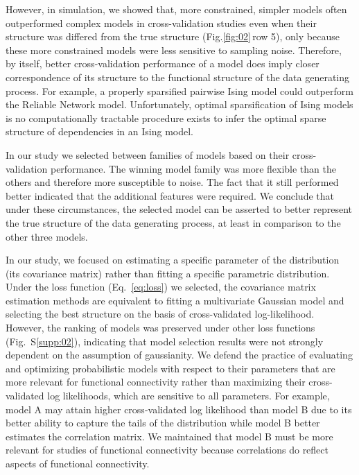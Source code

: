 \documentclass[10pt]{article}
\newcommand{\figref}[2]{Fig.\;\ref{fig:#1}\,#2}
\begin{document}
However, in simulation, we showed that, more constrained, simpler models often outperformed complex models in cross-validation studies even when their structure was differed from the true structure (\figref{02}{row 5}), only because these more constrained models were less sensitive to sampling noise. Therefore, by itself, better cross-validation performance of a model does imply closer correspondence of its structure to the functional structure of the data generating process. For example, a properly sparsified pairwise Ising model could outperform the Reliable Network model.  Unfortunately, optimal sparsification of Ising models is no computationally tractable procedure exists to infer the optimal sparse structure of dependencies in an Ising model.

In our study we selected between families of models based on their cross-validation performance. The winning model family was more flexible than the others and therefore more susceptible to noise. The fact that it still performed better indicated that the additional features were required. We conclude that under these circumstances, the selected model can be asserted to better represent the true structure of the data generating process, at least in comparison to the other three models.

In our study, we focused on estimating a specific parameter of the distribution (its covariance matrix) rather than fitting a specific parametric distribution.  Under the loss function (Eq.~\ref{eq:loss}) we selected, the covariance matrix estimation methods are equivalent to fitting a multivariate Gaussian model and selecting the best structure on the basis of cross-validated log-likelihood. However, the ranking of models was preserved under other loss functions (Fig.~S\ref{supp:02}), indicating that model selection results were not strongly dependent on the assumption of gaussianity. We defend the practice of evaluating and optimizing probabilistic models with respect to their parameters that are more relevant for functional connectivity rather than maximizing their cross-validated log likelihoods, which are sensitive to all parameters. For example, model A may attain higher cross-validated log likelihood than model B due to its better ability to capture the tails of the distribution while model B better estimates the correlation matrix. We maintained that model B must be more relevant for studies of functional connectivity because correlations do reflect aspects of functional connectivity. 
\end{document}
